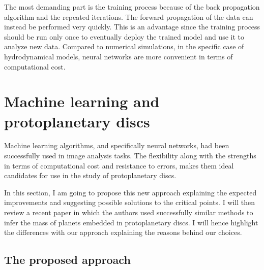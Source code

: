 \documentclass[a4paper,10pt]{report}
\begin{document}
The most demanding part is the training process because of the back propagation 
algorithm and the repeated iterations.
The forward propagation of the data can instead be performed  very quickly.
This is an advantage since the training process should be run only once to eventually deploy the trained model
and use it to analyze new data. Compared to numerical simulations, in the specific case of hydrodynamical models, 
neural networks are more convenient in terms of computational cost.

\section{Machine learning and protoplanetary discs}

Machine learning algorithms, and specifically neural networks, had been successfully used in image analysis tasks.
The flexibility along with the strengths in terms of computational cost and resistance to 
errors, makes them ideal candidates for use in the study of protoplanetary discs.

In this section, I am going to propose this new approach explaining the expected improvements and 
suggesting possible solutions to the critical points. I will then review a recent paper in which the 
authors used successfully similar methods to infer the mass of planets embedded in protoplanetary discs.
I will hence highlight the differences with our approach explaining the reasons behind our choices.

\subsection{The proposed approach}

\end{document}

